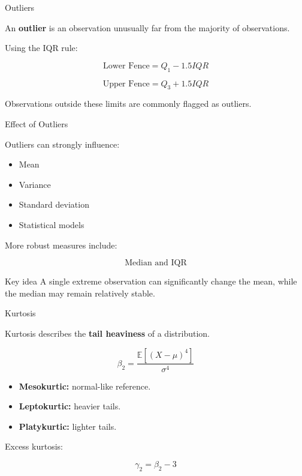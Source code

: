 \documentclass[aspectratio=169,11pt]{beamer}
\newcommand{\E}{\mathbb{E}}
\begin{document}
\begin{frame}{Outliers}

An \textbf{outlier} is an observation unusually far from the majority of observations.

Using the IQR rule:

\[
\boxed{
\text{Lower Fence}=Q_1-1.5IQR
}
\]

\[
\boxed{
\text{Upper Fence}=Q_3+1.5IQR
}
\]

Observations outside these limits are commonly flagged as outliers.

\end{frame}

\begin{frame}{Effect of Outliers}

Outliers can strongly influence:

\begin{itemize}
    \item Mean
    \item Variance
    \item Standard deviation
    \item Statistical models
\end{itemize}

More robust measures include:

\[
\boxed{\text{Median and IQR}}
\]

\begin{alertblock}{Key idea}
A single extreme observation can significantly change the mean, while the median may remain relatively stable.
\end{alertblock}

\end{frame}

\begin{frame}{Kurtosis}

Kurtosis describes the \textbf{tail heaviness} of a distribution.

\[
\boxed{
\beta_2=
\frac{\E[(X-\mu)^4]}{\sigma^4}
}
\]

\begin{itemize}
    \item \textbf{Mesokurtic:} normal-like reference.
    \item \textbf{Leptokurtic:} heavier tails.
    \item \textbf{Platykurtic:} lighter tails.
\end{itemize}

Excess kurtosis:

\[
\boxed{\gamma_2=\beta_2-3}
\]

\end{frame}
\end{document}
